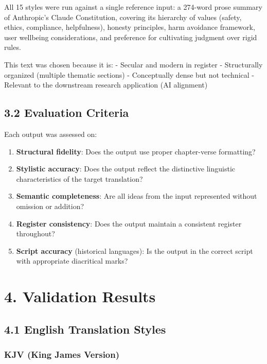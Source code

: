 \documentclass[10pt, letterpaper, twocolumn]{article}
\providecommand{\tightlist}{\setlength{\itemsep}{0pt}\setlength{\parskip}{0pt}}
\begin{document}
All 15 styles were run against a single reference input: a 274-word prose summary of Anthropic's Claude Constitution, covering its hierarchy of values (safety, ethics, compliance, helpfulness), honesty principles, harm avoidance framework, user wellbeing considerations, and preference for cultivating judgment over rigid rules.

This text was chosen because it is: - Secular and modern in register - Structurally organized (multiple thematic sections) - Conceptually dense but not technical - Relevant to the downstream research application (AI alignment)

\subsection*{3.2 Evaluation Criteria}\label{evaluation-criteria}

Each output was assessed on:

\begin{enumerate}
\def\labelenumi{\arabic{enumi}.}
\tightlist
\item
  \textbf{Structural fidelity}: Does the output use proper chapter-verse formatting?
\item
  \textbf{Stylistic accuracy}: Does the output reflect the distinctive linguistic characteristics of the target translation?
\item
  \textbf{Semantic completeness}: Are all ideas from the input represented without omission or addition?
\item
  \textbf{Register consistency}: Does the output maintain a consistent register throughout?
\item
  \textbf{Script accuracy} (historical languages): Is the output in the correct script with appropriate diacritical marks?
\end{enumerate}

\section*{4. Validation Results}\label{validation-results}

\subsection*{4.1 English Translation Styles}\label{english-translation-styles}

\subsubsection*{KJV (King James Version)}\label{kjv-king-james-version}
\end{document}
